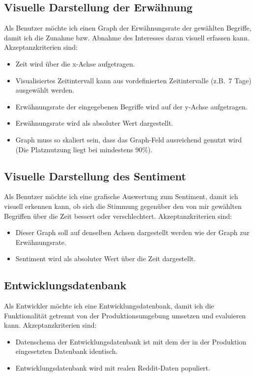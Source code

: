 \documentclass[a4paper, 10pt, conference]{IEEEtran}
\begin{document}
\subsection{Visuelle Darstellung der Erwähnung}

Als Benutzer möchte ich einen Graph der Erwähnungsrate der gewählten Begriffe, damit ich die Zunahme bzw. Abnahme des Interesses daran visuell erfassen kann. Akzeptanzkriterien sind:
\begin{itemize}
\item Zeit wird über die x-Achse aufgetragen.
\item Visualisiertes Zeitintervall kann aus vordefinierten Zeitintervalle (z.B.~7 Tage) ausgewählt werden.
\item Erwähnungsrate der eingegebenen Begriffe wird auf der y-Achse aufgetragen.
\item Erwähnungsrate wird als absoluter Wert dargestellt.
\item Graph muss so skaliert sein, dass das Graph-Feld ausreichend genutzt wird (Die Platznutzung liegt bei mindestens 90\%).
\end{itemize}

\subsection{Visuelle Darstellung des Sentiment}

Als Benutzer möchte ich eine grafische Auswertung zum Sentiment, damit ich visuell erkennen kann, ob sich die Stimmung gegenüber den von mir gewählten Begriffen über die Zeit bessert oder verschlechtert. Akzeptanzkriterien sind:
\begin{itemize}
\item Dieser Graph soll auf denselben Achsen dargestellt werden wie der Graph zur Erwähnungsrate.
\item Sentiment wird als absoluter Wert über die Zeit dargestellt.
\end{itemize}

\subsection{Entwicklungsdatenbank}

Als Entwickler möchte ich eine Entwicklungsdatenbank, damit ich die Funktionalität getrennt von der Produktionsumgebung umsetzen und evaluieren kann. Akzeptanzkriterien sind:
\begin{itemize}
\item Datenschema der Entwicklungsdatenbank ist mit dem der in der Produktion eingesetzten Datenbank identisch.
\item Entwicklungsdatenbank wird mit realen Reddit-Daten populiert.
\end{itemize}
\end{document}
